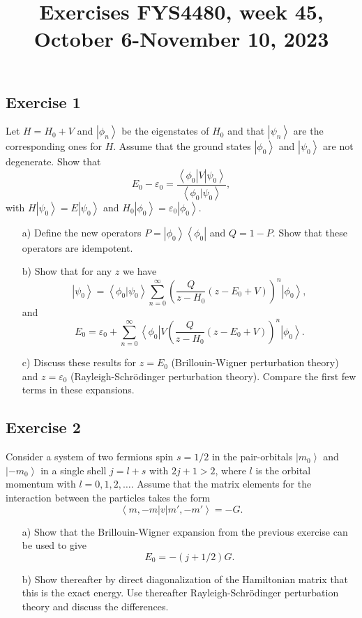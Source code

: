 \documentclass[prc]{revtex4}
\newcommand{\bra}[1]{\left\langle #1 \right|}
\newcommand{\ket}[1]{\left| #1 \right\rangle}
\begin{document}
\title{Exercises FYS4480, week 45, October 6-November 10, 2023}

\maketitle

\subsection*{Exercise 1}
Let $H=H_0 +V$ and $\ket{\phi_n}$ be the eigenstates of $H_0$ and that
$\ket{\psi_n}$ are the corresponding ones for $H$. 
Assume that the ground states
$\ket{\phi_0}$ and $\ket{\psi_0}$ are not degenerate. Show that
\[
E_0 -\varepsilon_0 =\frac{\bra{\phi_0} V\ket{\psi_0}}
{\left\langle \phi_0 | \psi_0 \right\rangle},
\]
with $H\ket{\psi_0} =E\ket{\psi_0}$ and
$H_0\ket{\phi_0} =\varepsilon_0\ket{\phi_0}$.
\begin{enumerate}
\item[a)]
Define the new operators $P=\ket{\phi_0}\bra{\phi_0}$ and $Q=1-P$. Show that these operators are idempotent.
\item[b)]
Show that for any  $z$ we have 
\[
\ket{\psi_0}=
	    \left\langle \phi_0 | \psi_0 \right\rangle
	    \sum_{n=0}^{\infty}\left(\frac{Q}{z-H_0}(z-E_0+V)\right)^n
	    \ket{\phi_0},
\]
and
\[
E_0=\varepsilon_0+
    \sum_{n=0}^{\infty}\bra{\phi_0}V
    \left(\frac{Q}{z-H_0}(z-E_0+V)\right)^n
    \ket{\phi_0}.
\]
\item[c)]
Discuss these results  for $z=E_0$ (Brillouin-Wigner perturbation theory)
and $z=\varepsilon_0$ (Rayleigh-Schr\"{o}dinger perturbation theory).
Compare the first few terms in these expansions.
\end{enumerate}
\subsection*{Exercise 2}
Consider a system of two fermions spin $s=1/2$ in the pair-orbitals
$\ket{m_0}$ and $\ket{-m_0}$ in a single shell $j=l+s$ with $2j+1>2$, where $l$ is the orbital momentum with $l=0,1,2,\dots$.
Assume that the matrix elements for the interaction between the particles
takes the form
\[
\bra{m,-m}v\ket{m',-m'}=-G.
\]
\begin{enumerate}
\item[a)]
Show that the Brillouin-Wigner expansion from the previous exercise can be used
to give
\[
E_0=-(j+1/2)G.
\]
\item[b)] Show thereafter by direct diagonalization of the  Hamiltonian
matrix that this is the exact energy. Use thereafter 
Rayleigh-Schr\"{o}dinger perturbation theory and discuss the differences.
\end{enumerate}
\end{document}
